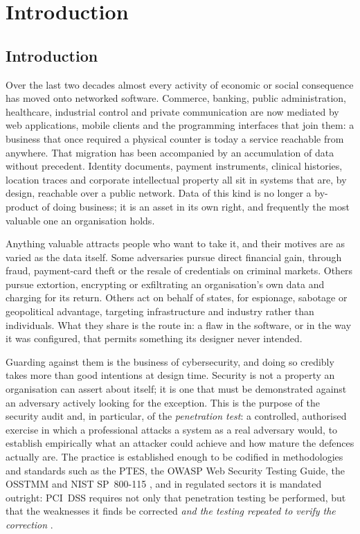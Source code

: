 \chapter{Introduction}
\label{ch:intro}

\setlength{\emergencystretch}{3em}

\section{Introduction}
\label{sec:intro-context}

Over the last two decades almost every activity of economic or social consequence
has moved onto networked software. Commerce, banking, public administration,
healthcare, industrial control and private communication are now mediated by web
applications, mobile clients and the programming interfaces that join them: a
business that once required a physical counter is today a service reachable from
anywhere. That migration has been accompanied by an accumulation of data without
precedent. Identity documents, payment instruments, clinical histories, location
traces and corporate intellectual property all sit in systems that are, by design,
reachable over a public network. Data of this kind is no longer a by-product of
doing business; it is an asset in its own right, and frequently the most valuable
one an organisation holds.

Anything valuable attracts people who want to take it, and their motives are as
varied as the data itself. Some adversaries pursue direct financial gain, through
fraud, payment-card theft or the resale of credentials on criminal markets. Others
pursue extortion, encrypting or exfiltrating an organisation's own data and charging
for its return. Others act on behalf of states, for espionage, sabotage or
geopolitical advantage, targeting infrastructure and industry rather than
individuals. What they share is the route in: a flaw in the software, or in the way
it was configured, that permits something its designer never intended.

Guarding against them is the business of cybersecurity, and doing so credibly takes
more than good intentions at design time. Security is not a property an organisation
can assert about itself; it is one that must be demonstrated against an adversary
actively looking for the exception. This is the purpose of the security audit and,
in particular, of the \emph{penetration test}: a controlled, authorised exercise in
which a professional attacks a system as a real adversary would, to establish
empirically what an attacker could achieve and how mature the defences actually are.
The practice is established enough to be codified in methodologies and standards
such as the PTES, the OWASP Web Security Testing Guide, the OSSTMM and NIST
SP~800-115 \cite{ptes, owasp_wstg, osstmm, nist80015}, and in regulated sectors it
is mandated outright: PCI~DSS requires not only that penetration testing be
performed, but that the weaknesses it finds be corrected \emph{and the testing
repeated to verify the correction} \cite{pcidss}.

